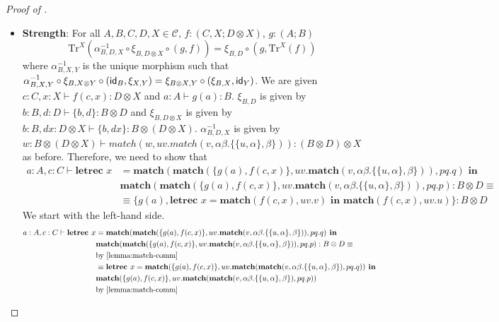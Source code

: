 \begin{proof}[Proof of ]
\begin{itemize}
\begin{align*}
\end{align*}
We can see that the left-hand side and the right-hand side are the same, so we are done.
\item \textbf{Strength}:  For all $A,B,C,D,X \in \mathcal{C}$, $f : (C,X;D \otimes X)$, $g : (A;B)$
\[
\text{Tr}^{X}(\alpha_{B,D,X}^{-1} \circ \xi_{B, D \otimes X} \circ (g,f)) = \xi_{B,D} \circ (g, \text{Tr}^{X}(f))
\]
where $\alpha_{B,X,Y}^{-1}$ is the unique morphism such that $\alpha_{B,X,Y}^{-1} \circ \xi_{B,X \otimes Y} \circ (\textsf{id}_{B}, \xi_{X,Y}) = \xi_{B \otimes X, Y} \circ (\xi_{B,X}, \textsf{id}_{Y})$.
We are given $c : C, x : X \vdash f(c,x) : D \otimes X$ and $a : A \vdash g(a) : B$.
$\xi_{B, D}$ is given by $b : B, d : D \vdash \{b, d\} : B \otimes D$ and $\xi_{B, D \otimes X}$ is given by $b : B, dx : D \otimes X \vdash \{b, dx\} : B \otimes (D \otimes X)$.
$\alpha_{B,D,X}^{-1}$ is given by $w : B \otimes (D \otimes X) \vdash  match(w, uv. match(v, \alpha\beta.\{\{u,\alpha\},\beta\})) : (B \otimes D) \otimes X$ as before. 
Therefore, we need to show that
\begin{align*}
a : A, c : C \vdash \textbf{letrec } x &= \textbf{match}(\textbf{match}(\{g(a), f(c,x)\}, uv.\textbf{match}(v, \alpha\beta.\{\{u,\alpha\},\beta\})), pq.q) \textbf{ in }\\
&\textbf{match}(\textbf{match}(\{g(a), f(c,x)\}, uv.\textbf{match}(v, \alpha\beta.\{\{u,\alpha\},\beta\})), pq.p) : B \otimes D \equiv\\
&\equiv \{g(a), \textbf{letrec } x = \textbf{match}(f(c,x), uv.v) \textbf{ in } \textbf{match}(f(c,x), uv.u)\} : B \otimes D
\end{align*}
We start with the left-hand side.
\begin{align*}
a : A, c : C \vdash \textbf{letrec } x &= \textbf{match}(\textbf{match}(\{g(a), f(c,x)\}, uv.\textbf{match}(v, \alpha\beta.\{\{u,\alpha\},\beta\})), pq.q) \textbf{ in }\\
&\textbf{match}(\textbf{match}(\{g(a), f(c,x)\}, uv.\textbf{match}(v, \alpha\beta.\{\{u,\alpha\},\beta\})), pq.p) : B \otimes D \equiv\\
&\text{by \cref{lemma:match-comm}}\\
&\equiv \textbf{letrec } x = \textbf{match}(\{g(a),f(c,x)\}, uv.\textbf{match}(\textbf{match}(v,\alpha\beta.\{\{u,\alpha\}, \beta\}), pq.q)) \textbf{ in }\\
&\textbf{match}(\{g(a),f(c,x)\}, uv.\textbf{match}(\textbf{match}(v,\alpha\beta.\{\{u,\alpha\}, \beta\}), pq.p))\\
&\text{by \cref{lemma:match-comm}}\\

\end{align*}
\end{itemize}
\end{proof}
